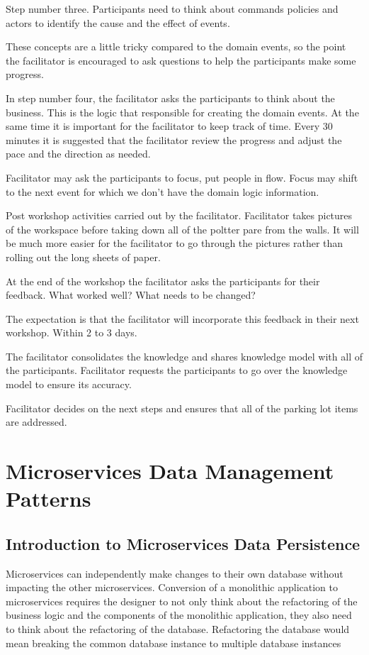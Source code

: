\documentclass[a4paper, 11pt]{book}
\begin{document}
    Step number three.
    Participants need to think about commands policies and actors to identify the cause and the effect of events.

    These concepts are a little tricky compared to the domain events, so the point the facilitator is encouraged to ask questions to help the participants make some progress.

    In step number four, the facilitator asks the participants to think about the business.
    This is the logic that responsible for creating the domain events.
    At the same time it is important for the facilitator to keep track of time.
    Every 30 minutes it is suggested that the facilitator review the progress and adjust the pace and the direction as needed.

    Facilitator may ask the participants to focus, put people in flow.
    Focus may shift to the next event for which we don't have the domain logic information.

    Post workshop activities carried out by the facilitator.
    Facilitator takes pictures of the workspace before taking down all of the poltter pare from the walls.
    It will be much more easier for the facilitator to go through the pictures rather than rolling out the long sheets of paper.

    At the end of the workshop the facilitator asks the participants for their feedback.
    What worked well?
    What needs to be changed?

    The expectation is that the facilitator will incorporate this feedback in their next workshop.
    Within 2 to 3 days.

    The facilitator consolidates the knowledge and shares knowledge model with all of the participants.
    Facilitator requests the participants to go over the knowledge model to ensure its accuracy.

    Facilitator decides on the next steps and ensures that all of the parking lot items are addressed.



    \chapter{Microservices Data Management Patterns}


    \section{Introduction to Microservices Data Persistence}
    Microservices can independently make changes to their own database without impacting the other microservices.
    Conversion of a monolithic application to microservices requires the designer to not only think about the refactoring of the business logic and the components of the monolithic application,
    they also need to think about the refactoring of the database.
    Refactoring the database would mean breaking the common database instance to multiple database instances
\end{document}
